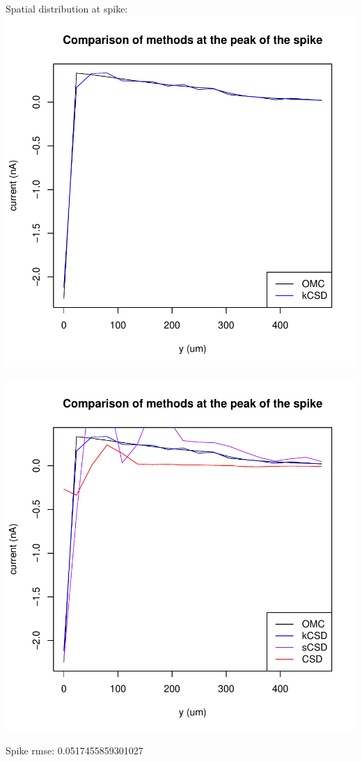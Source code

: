 \documentclass[10pt,a4paper]{report}
\begin{document}
Spatial distribution at spike:
\includegraphics{bs_1D_130506-spatialspike}

\includegraphics{bs_1D_130506-spatialspike2}
\begin{Schunk}
\begin{Soutput}
Spike rmse: 0.0517455859301027
\end{Soutput}
\end{Schunk}
\end{document}
